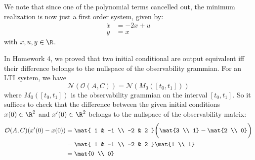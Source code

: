 \documentclass{homework}
\newcommand{\obs}{\mathcal{O}}
\begin{document}
\begin{letterenum}
We note that since one of the polynomial terms cancelled out, the
minimum realization is now just a first order system, given by:
\begin{align*}
    \dot{x} &= -2x + u \\
    y &= x
\end{align*}
with $x,u,y \in \R$.

\item In Homework 4, we proved that two initial conditional are output
equivalent iff their difference belongs to the nullspace of the
observability grammian. For an LTI system, we have
\begin{equation*}
    \mathcal{N}(\obs(A, C)) = \mathcal{N}(M_0([t_0, t_1]))
\end{equation*}
where $M_0([t_0, t_1])$ is the observability grammian on the interval
$[t_0, t_1]$. So it suffices to check that the difference between
the given initial conditions $x(0)\in\R^2$ and $x'(0)\in\R^2$ belongs to the
nullspace of the observability matrix:
\begin{align*}
    \obs(A,C) (x'(0) - x(0)) &= \mat{
        1 & -1 \\
        -2 & 2
    } \biggl(
        \mat{3 \\ 1} - \mat{2 \\ 0}
    \biggr) \\
    &= \mat{
        1 & -1 \\
        -2 & 2
    } \mat{1 \\ 1} \\
    &= \mat{0 \\ 0}
\end{align*}
\end{letterenum}
\end{document}
